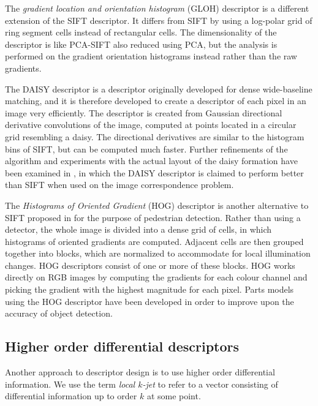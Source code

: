 \documentclass[../thesis.tex]{subfiles}
\begin{document}
The \emph{gradient location and orientation histogram} (GLOH) descriptor \cite{mikolajczyk2005performance} is a different extension of the SIFT descriptor. It differs from SIFT by using a log-polar grid of ring segment cells instead of rectangular cells. The dimensionality of the descriptor is like PCA-SIFT also reduced using PCA, but the analysis is performed on the gradient orientation histograms instead rather than the raw gradients.

The DAISY descriptor \cite{tola2008fast} is a descriptor originally developed for dense wide-baseline matching, and it is therefore developed to create a descriptor of each pixel in an image very efficiently. The descriptor is created from Gaussian directional derivative convolutions of the image, computed at points located in a circular grid resembling a daisy. The directional derivatives are similar to the histogram bins of SIFT, but can be computed much faster. Further refinements of the algorithm and experiments with the actual layout of the daisy formation have been examined in \cite{winder2009picking}, in which the DAISY descriptor is claimed to perform better than SIFT when used on the image correspondence problem.

The \emph{Histograms of Oriented Gradient} (HOG) descriptor is another alternative to SIFT proposed in \cite{dalal2005histograms} for the purpose of pedestrian detection. Rather than using a detector, the whole image is divided into a dense grid of cells, in which histograms of oriented gradients are computed. Adjacent cells are then grouped together into blocks, which are normalized to accommodate for local illumination changes. HOG descriptors consist of one or more of these blocks. HOG works directly on RGB images by computing the gradients for each colour channel and picking the gradient with the highest magnitude for each pixel. Parts models using the HOG descriptor have been developed \cite{felzenszwalb2008discriminatively} in order to improve upon the accuracy of object detection.

\subsection{Higher order differential descriptors}

Another approach to descriptor design is to use higher order differential information. We use the term \emph{local $k$-jet} to refer to a vector consisting of differential information up to order $k$ at some point.
\end{document}
